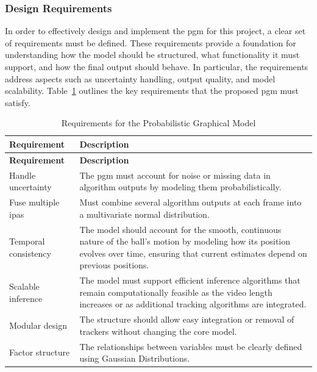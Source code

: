 \documentclass[12pt,a4paper]{article}
\begin{document}
\subsubsection{Design Requirements}
In order to effectively design and implement the \acs{pgm} for this project, a clear set of requirements must be defined. These requirements provide a foundation for understanding how the model should be structured, what functionality it must support, and how the final output should behave. In particular, the requirements address aspects such as uncertainty handling, output quality, and model scalability. Table~\ref{tab:pgm_requirements} outlines the key requirements that the proposed \acs{pgm} must satisfy.

\begin{longtable}{p{} p{}}
\caption{Requirements for the Probabilistic Graphical Model} \label{tab:pgm_requirements} \\
\hline
\textbf{Requirement} & \textbf{Description} \\
\hline
\endfirsthead
\hline
\textbf{Requirement} & \textbf{Description} \\
\hline
\endhead
\hline
\endfoot
\hline
\endlastfoot
Handle uncertainty & The \acs{pgm} must account for noise or missing data in algorithm outputs by modeling them probabilistically. \\

Fuse multiple \acs{ipa}s & Must combine several algorithm outputs at each frame into a multivariate normal distribution. \\

Temporal consistency & The model should account for the smooth, continuous nature of the ball's motion by modeling how its position evolves over time, ensuring that current estimates depend on previous positions.\\

Scalable inference & The model must support efficient inference algorithms that remain computationally feasible as the video length increases or as additional tracking algorithms are integrated. \\

Modular design & The structure should allow easy integration or removal of trackers without changing the core model. \\

Factor structure & The relationships between variables must be clearly defined using Gaussian Distributions. \\
\end{longtable}
\end{document}
